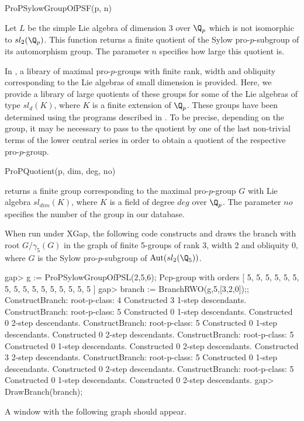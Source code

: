 \> ProPSylowGroupOfPSF(p, n)

Let $L$ be the simple Lie algebra of dimension $3$ over $\Q_p$
which is not isomorphic to $sl_2(\Q_p)$. This function  returns a
finite quotient of the Sylow pro-$p$-subgroup of its automorphism  
group. The parameter $n$ specifies how large this quotient is.

In \cite{KLGP97}, a library of maximal pro-$p$-groups with finite
rank, width and obliquity corresponding to the Lie algebras of small
dimension is provided. Here, we provide a library of large quotients
of these groups for some of the Lie algebras of type $sl_d(K)$, where
$K$ is a finite extension of $\Q_p$. 
These groups have been determined using the programs described in
\cite{KLGP97}. To be precise, depending on the group, it may be
necessary to pass to the quotient by one of the last non-trivial terms
of the lower central series in order to obtain a quotient of the
respective pro-$p$-group.

\> ProPQuotient(p, dim, deg, no)

returns a finite group corresponding to the maximal pro-$p$-group $G$
with Lie algebra $sl_{dim}(K)$, where $K$ is a field of
degree $deg$ over $\Q_p$. The parameter $no$ specifies the number of
the group in our database.


When run under XGap, the following code constructs and draws the
branch with root $G/\gamma_5(G)$ in the graph of finite 5-groups of
rank 3, width 2 and obliquity 0, where $G$ is the Sylow
pro-$p$-subgroup of ${\rm Aut}(sl_2(\Q_5))$.

\beginexample
gap> g := ProPSylowGroupOfPSL(2,5,6);
Pcp-group with orders [ 5, 5, 5, 5, 5, 5, 5, 5, 5, 5, 5, 5, 5, 5, 5, 5 ]
gap> branch := BranchRWO(g,5,[3,2,0]);;
ConstructBranch: root-p-class: 4
Constructed 3 1-step descendants.
ConstructBranch: root-p-class: 5
Constructed 0 1-step descendants.
Constructed 0 2-step descendants.
ConstructBranch: root-p-class: 5
Constructed 0 1-step descendants.
Constructed 0 2-step descendants.
ConstructBranch: root-p-class: 5
Constructed 0 1-step descendants.
Constructed 0 2-step descendants.
Constructed 3 2-step descendants.
ConstructBranch: root-p-class: 5
Constructed 0 1-step descendants.
Constructed 0 2-step descendants.
ConstructBranch: root-p-class: 5
Constructed 0 1-step descendants.
Constructed 0 2-step descendants.
gap> DrawBranch(branch);
\endexample

A window with the following graph should appear.

\epsfxsize=8cm 